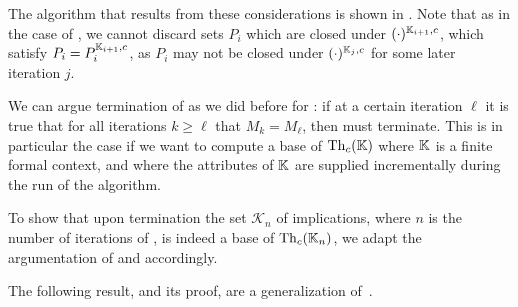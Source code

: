 The algorithm that results from these considerations is shown in
.  Note that as in the case of
, we cannot discard sets $P_{i}$ which are closed
under $(\cdot)^{{\mathbb{K}}_{i+1}, c}$, \ie which satisfy $P_{i} = P_{i}^{{\mathbb{K}}_{i+1}, c}$, as
$P_{i}$ may not be closed under $(\cdot)^{{\mathbb{K}}_{j}, c}$ for some later iteration $j$.

We can argue termination of  as we did before
for : if at a certain iteration $\ell$ it is true
that for all iterations $k \geq \ell$ that $M_{k} = M_{\ell}$, then
 must terminate.  This is in particular the
case if we want to compute a base of $\operatorname{Th}_{c}({\mathbb{K}})$ where ${\mathbb{K}}$ is a finite formal
context, and where the attributes of ${\mathbb{K}}$ are supplied incrementally during the run of
the algorithm.

To show that upon termination the set $\mathcal{K}_{n}$ of implications, where $n$ is the
number of iterations of , is indeed a base of
$\operatorname{Th}_{c}({\mathbb{K}}_{n})$, we adapt the argumentation of  and
 accordingly.

The following result, and its proof, are a generalization of~\cite[Lemma~6.3]{Diss-Felix}.

